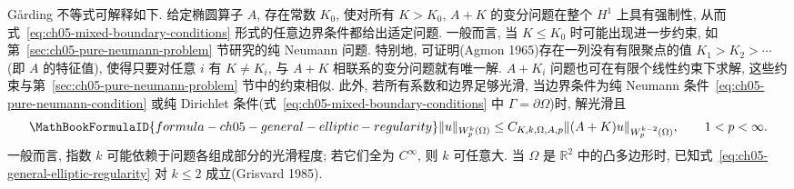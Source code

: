 Gårding 不等式可解释如下. 给定椭圆算子 $A$, 存在常数 $K_0$, 使对所有 $K>K_0$, $A+K$ 的变分问题在整个 $H^1$ 上具有强制性, 从而式~\eqref{eq:ch05-mixed-boundary-conditions} 形式的任意边界条件都给出适定问题. 一般而言, 当 $K\leq K_0$ 时可能出现进一步约束, 如第~\ref{sec:ch05-pure-neumann-problem} 节研究的纯 Neumann 问题. 特别地, 可证明(Agmon 1965)存在一列没有有限聚点的值 $K_1>K_2>\cdots$(即 $A$ 的特征值), 使得只要对任意 $i$ 有 $K\ne K_i$, 与 $A+K$ 相联系的变分问题就有唯一解. $A+K_i$ 问题也可在有限个线性约束下求解, 这些约束与第~\ref{sec:ch05-pure-neumann-problem} 节中的约束相似. 此外, 若所有系数和边界足够光滑, 当边界条件为纯 Neumann 条件~\eqref{eq:ch05-pure-neumann-condition} 或纯 Dirichlet 条件(式~\eqref{eq:ch05-mixed-boundary-conditions} 中 $\Gamma=\partial\Omega$)时, 解光滑且
\begin{equation}
\MathBookFormulaID{formula-ch05-general-elliptic-regularity}
\label{eq:ch05-general-elliptic-regularity}
\|u\|_{W_p^k(\Omega)}
\leq C_{K,k,\Omega,A,p}\|(A+K)u\|_{W_p^{k-2}(\Omega)},
\qquad1<p<\infty.
\end{equation}
一般而言, 指数 $k$ 可能依赖于问题各组成部分的光滑程度; 若它们全为 $C^\infty$, 则 $k$ 可任意大. 当 $\Omega$ 是 $\mathbb R^2$ 中的凸多边形时, 已知式~\eqref{eq:ch05-general-elliptic-regularity} 对 $k\leq2$ 成立(Grisvard 1985).
